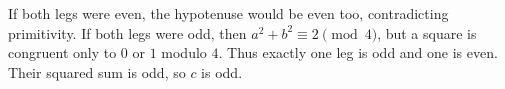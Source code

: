 If both legs were even, the hypotenuse would be even too, contradicting primitivity. If both legs were odd, then $a^2+b^2\equiv2\pmod4$, but a square is congruent only to $0$ or $1$ modulo $4$. Thus exactly one leg is odd and one is even. Their squared sum is odd, so $c$ is odd.
